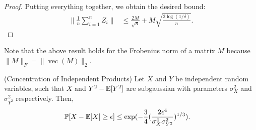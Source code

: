 \documentclass[tablecaption=bottom]{jmlr}
\DeclareMathOperator{\vvec} {vec}
\begin{document}
\begin{proof}
Putting everything together, we obtain the desired bound:
\begin{align}
\|\frac{1}{n}\sum_{i=1}^n Z_i\|
&\le \frac{2M}{\sqrt{n}} + M \sqrt{\frac{2\log(1/\delta)}{n}}.
\end{align}
\end{proof}

Note that the above result holds for the Frobenius norm of a matrix
$M$ because $\|M\|_F = \|\vvec(M)\|_2$.

\begin{lemma}(Concentration of Independent Products)
  \label{lemma:conc-prod}
  Let $X$ and $Y$ be independent random variables, such that $X$ and $Y^2 - \operatorname{\mathbb{E}}[Y^2]$ are subgaussian with parameters $\sigma^2_X$ and $\sigma^2_{Y^2}$ respectively.
  Then, 
  \begin{align}
    \mathbb{P}[ X - \operatorname{\mathbb{E}}[X] \ge \epsilon ] 
      &\le \exp( -\frac{3}{4} (\frac{2\epsilon^4}{\sigma^4_X \sigma^2_{Y^2}} )^{1/3} ).
  \end{align}
\end{lemma}
\end{document}
